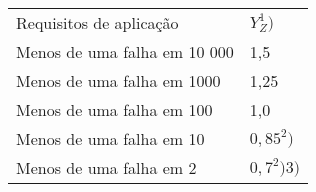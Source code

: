 \begin{table}[]
\begin{tabular}{ll}
Requisitos de aplicação      & $Y_Z^1)$    \\
Menos de uma falha em 10 000 & 1,5       \\
Menos de uma falha em 1000   & 1,25      \\
Menos de uma falha em 100    & 1,0       \\
Menos de uma falha em 10     & $0,85 ^ 2)$   \\
Menos de uma falha em 2      & $0,7^2) 3)$
\end{tabular}
\end{table}